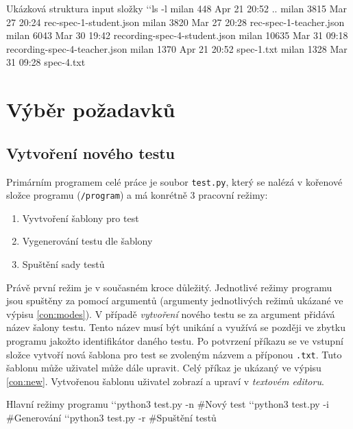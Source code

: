 \documentclass[czech, ma, kiv, he, iso690alph, pdf, viewonly]{fasthesis}
\begin{document}
    \newpage
    \begin{console}{Ukázková struktura input složky \label{con:input}} 
`\uxprompt`ls -l
milan    448 Apr 21 20:52 ..
milan   3815 Mar 27 20:24 rec-spec-1-student.json
milan   3820 Mar 27 20:28 rec-spec-1-teacher.json
milan   6043 Mar 30 19:42 recording-spec-4-student.json
milan  10635 Mar 31 09:18 recording-spec-4-teacher.json
milan   1370 Apr 21 20:52 spec-1.txt
milan   1328 Mar 31 09:28 spec-4.txt
    \end{console}

    \section{Výběr požadavků}

        \subsection{Vytvoření nového testu} \label{sec:test_creation}

            Primárním programem celé práce je soubor \verb|test.py|, který se nalézá v kořenové složce programu (\verb|/program|) a má konrétně 3 pracovní režimy:
            \begin{enumerate}
                \item Vyvtvoření šablony pro test
                \item Vygenerování testu dle šablony
                \item Spuštění sady testů
            \end{enumerate}
            Právě první režim je v současném kroce důležitý. Jednotlivé režimy programu jsou spuštěny za pomocí argumentů (argumenty jednotlivých režimů ukázané ve výpisu \ref{con:modes}). V případě \textit{vytvoření} nového testu se za argument přidává název šalony testu. Tento název musí být unikání a využívá se později ve zbytku programu jakožto identifikátor daného testu. Po potvrzení příkazu se ve vstupní složce vytvoří nová šablona pro test se zvoleným názvem a příponou \verb|.txt|. Tuto šablonu může uživatel může dále upravit. Celý příkaz je ukázaný ve výpisu \ref{con:new}. Vytvořenou šablonu uživatel zobrazí a upraví v \textit{textovém editoru}.

            \vfill

            \begin{console}{Hlavní režimy programu \label{con:modes}}
`\uxprompt`python3 test.py -n   #Nový test
`\uxprompt`python3 test.py -i   #Generování
`\uxprompt`python3 test.py -r   #Spuštění testů
            \end{console}
\end{document}
